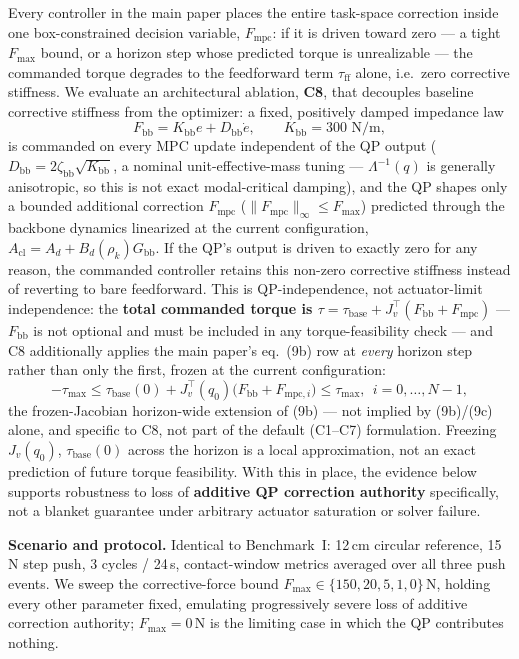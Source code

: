 \documentclass[journal]{IEEEtran}
\newcommand{\Laminv}{\Lambda^{-1}(q)}
\newcommand{\Fmpc}{F_{\text{mpc}}}
\newcommand{\Fmpck}[1]{F_{\text{mpc},#1}}
\begin{document}
Every controller in the main paper places the entire task-space
correction inside one box-constrained decision variable, $\Fmpc$: if it
is driven toward zero --- a tight $F_\text{max}$ bound, or a horizon step
whose predicted torque is unrealizable --- the commanded torque degrades
to the feedforward term $\tau_\text{ff}$ alone, i.e.\ zero corrective
stiffness. We evaluate an architectural ablation, \textbf{C8}, that
decouples baseline corrective stiffness from the optimizer: a fixed,
positively damped impedance law
\begin{equation*}
F_\text{bb}=K_\text{bb}e+D_\text{bb}\dot e,\qquad K_\text{bb}=300\text{ N/m},
\end{equation*}
is commanded on every MPC update independent of the QP output
($D_\text{bb}=2\zeta_\text{bb}\sqrt{K_\text{bb}}$, a nominal
unit-effective-mass tuning --- $\Laminv$ is generally anisotropic, so
this is not exact modal-critical damping), and the QP shapes only a
bounded additional correction $\Fmpc$ ($\|\Fmpc\|_\infty\le F_\text{max}$)
predicted through the backbone dynamics linearized at the current
configuration, $A_\text{cl}=A_d+B_d(\rho_k)G_\text{bb}$. If the QP's
output is driven to exactly zero for any reason, the commanded controller
retains this non-zero corrective stiffness instead of reverting to bare
feedforward. This is QP-independence, not actuator-limit independence:
the \textbf{total commanded torque is
$\tau=\tau_\text{base}+J_v^\top(F_\text{bb}+\Fmpc)$} --- $F_\text{bb}$ is
not optional and must be included in any torque-feasibility check ---
and C8 additionally applies the main paper's eq.~(9b) row at
\emph{every} horizon step rather than only the first, frozen at the
current configuration:
\begin{equation*}
-\tau_\text{max}\le\tau_\text{base}(0)+J_v^\top(q_0)\bigl(F_\text{bb}+\Fmpck{i}\bigr)\le\tau_\text{max},\ \ i=0,\ldots,N-1,
\end{equation*}
the frozen-Jacobian horizon-wide extension of (9b) --- not implied by
(9b)/(9c) alone, and specific to C8, not part of the default (C1--C7)
formulation. Freezing $J_v(q_0)$, $\tau_\text{base}(0)$ across the
horizon is a local approximation, not an exact prediction of future
torque feasibility. With this in place, the evidence below supports
robustness to loss of \textbf{additive QP correction authority}
specifically, not a blanket guarantee under arbitrary actuator saturation
or solver failure.

\textbf{Scenario and protocol.} Identical to Benchmark~I: 12\,cm
circular reference, 15\,N step push, 3 cycles / 24\,s, contact-window
metrics averaged over all three push events. We sweep the
corrective-force bound $F_\text{max}\in\{150,20,5,1,0\}$\,N, holding
every other parameter fixed, emulating progressively severe loss of
additive correction authority; $F_\text{max}=0$\,N is the limiting case
in which the QP contributes nothing.
\end{document}
